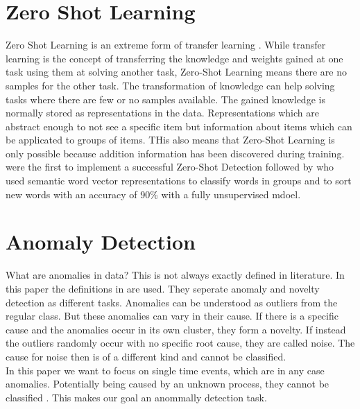 \section{Zero Shot Learning}
Zero Shot Learning is an extreme form of transfer learning \cite[S. 536]{goodfellow_deep_2016}. While transfer learning is the concept of transferring the knowledge and weights gained at one task using them at solving another task, Zero-Shot Learning means there are no samples for the other task. The transformation of knowledge can help solving tasks where there are few or no samples available. The gained knowledge is normally stored as representations in the data. Representations which are abstract enough to not see a specific item but information about items which can be applicated to groups of items. THis also means that Zero-Shot Learning is only possible because addition information has been discovered during training.\\
 were the first to implement a successful Zero-Shot Detection followed by  who used semantic word vector representations to classify words in groups and to sort new words with an accuracy of 90\% with a fully unsupervised mdoel.
\section{Anomaly Detection}
What are anomalies in data? This is not always exactly defined in literature. In this paper the definitions in  are used. They seperate anomaly and novelty detection as different tasks. Anomalies can be understood as outliers from the regular class. But these anomalies can vary in their cause. If there is a specific cause and the anomalies occur in its own cluster, they form a novelty. If instead the outliers randomly occur with no specific root cause, they are called noise. The cause for noise then is of a different kind and cannot be classified.\\
In this paper we want to focus on single time events, which are in any case anomalies. Potentially being caused by an unknown process, they cannot be classified \cite{gruhl_novelty_2022}. This makes our goal an anommally detection task.
